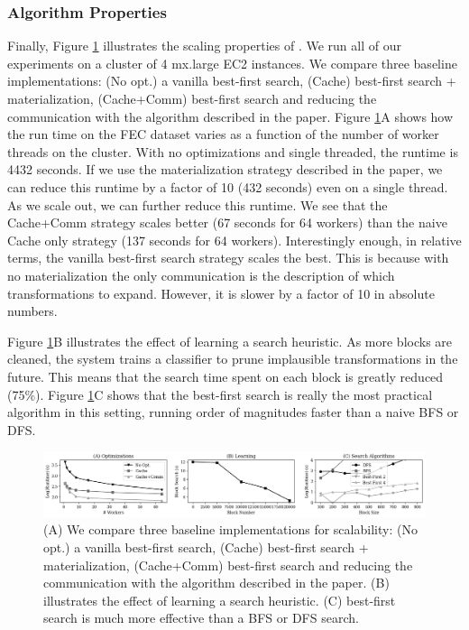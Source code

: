 \subsubsection{Algorithm Properties}
Finally, Figure \ref{fig:opt} illustrates the scaling properties of \sys. We run all of our experiments on a cluster of 4 mx.large EC2 instances. We compare three baseline implementations: (No opt.) a vanilla best-first search, (Cache) best-first search + materialization, (Cache+Comm) best-first search and reducing the communication with the algorithm described in the paper. 
Figure \ref{fig:opt}A shows how the run time on the FEC dataset varies as a function of the number of worker threads on the cluster.
With no optimizations and single threaded, the runtime is 4432 seconds.
If we use the materialization strategy described in the paper, we can reduce this runtime by a factor of 10 (432 seconds) even on a single thread.
As we scale out, we can further reduce this runtime.
We see that the Cache+Comm strategy scales better (67 seconds for 64 workers) than the naive Cache only strategy (137 seconds for 64 workers).
Interestingly enough, in relative terms, the vanilla best-first search strategy scales the best.
This is because with no materialization the only communication is the description of which transformations to expand.
However, it is slower by a factor of 10 in absolute numbers.

Figure \ref{fig:opt}B illustrates the effect of learning a search heuristic. As more blocks are cleaned, the system trains a classifier to prune implausible transformations in the future.
This means that the search time spent on each block is greatly reduced (75\%). 
Figure \ref{fig:opt}C shows that the best-first search is really the most practical algorithm in this setting, running order of magnitudes faster than a naive BFS or DFS.

 \begin{figure}[ht]
\centering
 \includegraphics[width=\textwidth]{exp/exp6.png}
 \caption{(A) We compare three baseline implementations for scalability: (No opt.) a vanilla best-first search, (Cache) best-first search + materialization, (Cache+Comm) best-first search and reducing the communication with the algorithm described in the paper. (B) illustrates the effect of learning a search heuristic. (C) best-first search is much more effective than a BFS or DFS search.
 \label{fig:opt}}
\end{figure}

